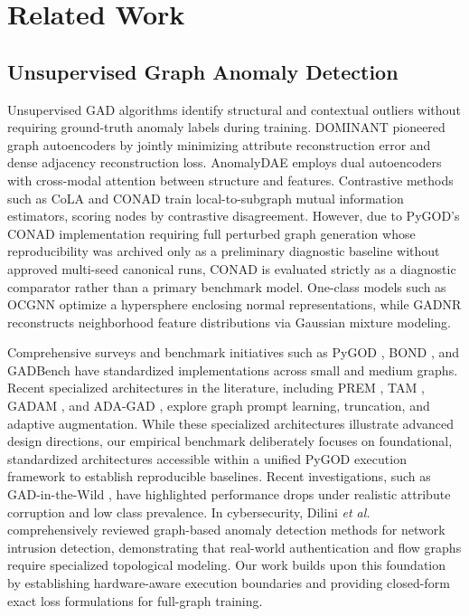 \documentclass[applsci,article,submit,moreauthors,pdftex]{Definitions/mdpi}
\newcommand{\etal}{\emph{et al.}}
\begin{document}
\section{Related Work}
\label{sec:related}

\subsection{Unsupervised Graph Anomaly Detection}
Unsupervised GAD algorithms identify structural and contextual outliers without requiring ground-truth anomaly labels during training. DOMINANT \cite{ding2019deep} pioneered graph autoencoders by jointly minimizing attribute reconstruction error and dense adjacency reconstruction loss. AnomalyDAE \cite{fan2020anomalydae} employs dual autoencoders with cross-modal attention between structure and features. Contrastive methods such as CoLA \cite{liu2022cola} and CONAD \cite{xu2022conad} train local-to-subgraph mutual information estimators, scoring nodes by contrastive disagreement. However, due to PyGOD's CONAD implementation requiring full perturbed graph generation whose reproducibility was archived only as a preliminary diagnostic baseline without approved multi-seed canonical runs, CONAD is evaluated strictly as a diagnostic comparator rather than a primary benchmark model. One-class models such as OCGNN \cite{wang2021ocgnn} optimize a hypersphere enclosing normal representations, while GADNR \cite{roy2024gadnr} reconstructs neighborhood feature distributions via Gaussian mixture modeling. 

Comprehensive surveys \cite{ma2023survey,qiao2025survey} and benchmark initiatives such as PyGOD \cite{liu2024pygod}, BOND \cite{liu2022bond}, and GADBench \cite{tang2023gadbench} have standardized implementations across small and medium graphs. Recent specialized architectures in the literature, including PREM \cite{pan2023prem}, TAM \cite{qiao2023tam}, GADAM \cite{chen2024gadam}, and ADA-GAD \cite{he2024adag}, explore graph prompt learning, truncation, and adaptive augmentation. While these specialized architectures illustrate advanced design directions, our empirical benchmark deliberately focuses on foundational, standardized architectures accessible within a unified PyGOD execution framework to establish reproducible baselines. Recent investigations, such as GAD-in-the-Wild \cite{zhou2026wild}, have highlighted performance drops under realistic attribute corruption and low class prevalence. In cybersecurity, Dilini \etal\ \cite{dilini2026comprehensive} comprehensively reviewed graph-based anomaly detection methods for network intrusion detection, demonstrating that real-world authentication and flow graphs require specialized topological modeling. Our work builds upon this foundation by establishing hardware-aware execution boundaries and providing closed-form exact loss formulations for full-graph training.
\end{document}
